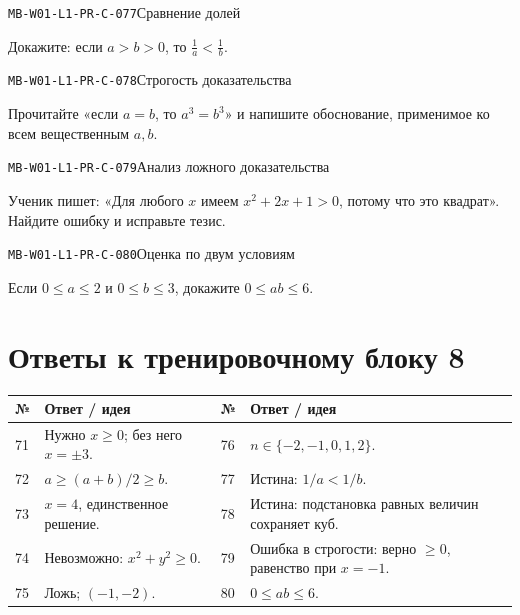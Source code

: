 \documentclass[11pt,a4paper,openany]{book}
\newcommand{\muid}[1]{\texttt{\footnotesize #1}}
\renewcommand{\arraystretch}{1.38}
\begin{document}
\noindent\hypertarget{MB-W01-L1-PR-C-077}{}\muid{MB-W01-L1-PR-C-077}\quad Сравнение долей\par

Докажите: если $a>b>0$, то $\frac1a<\frac1b$.\par\medskip

\noindent\hypertarget{MB-W01-L1-PR-C-078}{}\muid{MB-W01-L1-PR-C-078}\quad Строгость доказательства\par

Прочитайте «если $a=b$, то $a^3=b^3$» и напишите обоснование, применимое ко всем вещественным $a,b$.\par\medskip

\noindent\hypertarget{MB-W01-L1-PR-C-079}{}\muid{MB-W01-L1-PR-C-079}\quad Анализ ложного доказательства\par

Ученик пишет: «Для любого $x$ имеем $x^2+2x+1>0$, потому что это квадрат». Найдите ошибку и исправьте тезис.\par\medskip

\noindent\hypertarget{MB-W01-L1-PR-C-080}{}\muid{MB-W01-L1-PR-C-080}\quad Оценка по двум условиям\par

Если $0\le a\le2$ и $0\le b\le3$, докажите $0\le ab\le6$.\par\medskip

\clearpage\section*{Ответы к тренировочному блоку 8}


\begingroup\footnotesize\renewcommand{\arraystretch}{1.45}

\begin{tabularx}{\textwidth}{@{}p{10mm}X p{10mm}X@{}}\toprule № & Ответ / идея & № & Ответ / идея\\\midrule

71 & Нужно $x\ge0$; без него $x=\pm3$. & 76 & $n\in\{-2,-1,0,1,2\}$.\\

72 & $a\ge(a+b)/2\ge b$. & 77 & Истина: $1/a<1/b$.\\

73 & $x=4$, единственное решение. & 78 & Истина: подстановка равных величин сохраняет куб.\\

74 & Невозможно: $x^2+y^2\ge0$. & 79 & Ошибка в строгости: верно $\ge0$, равенство при $x=-1$.\\

75 & Ложь; $(-1,-2)$. & 80 & $0\le ab\le6$.\\

\bottomrule\end{tabularx}\endgroup
\end{document}
